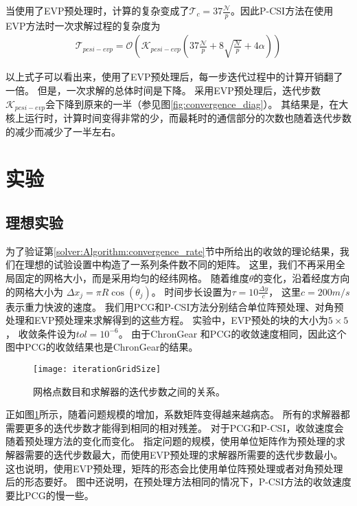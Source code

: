  
当使用了EVP预处理时，计算的复杂变成了$\mathcal{T}_c = 37 \frac{\mathcal{N}}{p}$。因此P-CSI方法在使用EVP方法时一次求解过程的复杂度为
\begin{eqnarray}
\label{t_pcsiEvp}
\mathcal{T}_{pcsi-evp}=\mathcal{O}(\mathcal{K}_{pcsi-evp} (37\frac{\mathcal{N}}{p} +8\sqrt{\frac{\mathcal{N} }{p}} + 4\alpha))
\end{eqnarray}

以上式子可以看出来，使用了EVP预处理后，每一步迭代过程中的计算开销翻了一倍。
但是，一次求解的总体时间是下降。 
采用EVP预处理后，迭代步数$\mathcal{K}_{pcsi-evp}$会下降到原来的一半（参见图\ref{fig:convergence_diag}）。
其结果是，在大核上运行时，计算时间变得非常的少，而最耗时的通信部分的次数也随着迭代步数的减少而减少了一半左右。





\section{实验} 
\label{solver:exp}
 
\subsection{理想实验}
为了验证第\ref{solver:Algorithm:convergence_rate}节中所给出的收敛的理论结果，我们在理想的试验设置中构造了一系列条件数不同的矩阵。
这里，我们不再采用全局固定的网格大小，而是采用均匀的经纬网格。
随着维度$\theta$的变化，沿着经度方向的网格大小为 $\Delta x_j  = \pi R \cos (\theta_j)$。
时间步长设置为$\tau = 10\frac{\Delta y}{c}$， 这里$c = 200m/s$ 表示重力快波的速度\cite{smith2010parallel}。 
我们用PCG和P-CSI方法分别结合单位阵预处理、对角预处理和EVP预处理来求解得到的这些方程。
实验中，EVP预处的块的大小为$5\times5$， 收敛条件设为$tol = 10^{-6}$。 
由于ChronGear 和PCG的收敛速度相同，因此这个图中PCG的收敛结果也是ChronGear的结果。
  

\begin{figure} 
\vspace{5pt}
\centering
\texttt{[image: iterationGridSize]}
\caption[] {网格点数目和求解器的迭代步数之间的关系。\label{fig:iterationGridSize}}
\end{figure}

正如图\ref{fig:iterationGridSize}所示，随着问题规模的增加，系数矩阵变得越来越病态。
所有的求解器都需要更多的迭代步数才能得到相同的相对残差。
对于PCG和P-CSI，收敛速度会随着预处理方法的变化而变化。 
指定问题的规模，使用单位矩阵作为预处理的求解器需要的迭代步数最大，而使用EVP预处理的求解器所需要的迭代步数最小。 
这也说明，使用EVP预处理，矩阵的形态会比使用单位阵预处理或者对角预处理后的形态要好。 
图中还说明，在预处理方法相同的情况下，P-CSI方法的收敛速度要比PCG的慢一些。 



